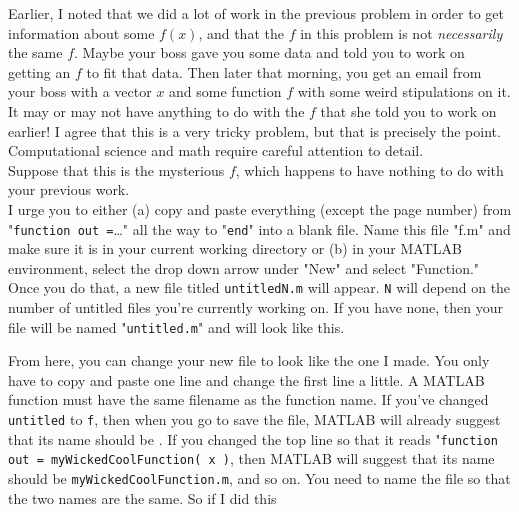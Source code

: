 \documentclass{article}
\begin{document}
Earlier, I noted that we did a lot of work in the previous problem in order to get information about some $f(x)$, and that the $f$ in this problem is not \textit{necessarily} the same $f$. Maybe your boss gave you some data and told you to work on getting an $f$ to fit that data. Then later that morning, you get an email from your boss with a vector $x$ and some function $f$ with some weird stipulations on it. It may or may not have anything to do with the $f$ that she told you to work on earlier! I agree that this is a very tricky problem, but that is precisely the point. Computational science and math require careful attention to detail.\\

Suppose that this is the mysterious $f$, which happens to have nothing to do with your previous work.\\



I urge you to either (a) copy and paste everything (except the page number) from "\texttt{function out =}\dots" all the way to "\texttt{end}" into a blank file. Name this file "f.m" and make sure it is in your current working directory or (b) in your MATLAB environment, select the drop down arrow under "New" and select "Function." Once you do that, a new file titled \texttt{untitledN.m} will appear. \texttt{N} will depend on the number of untitled files you're currently working on. If you have none, then your file will be named "\texttt{untitled.m}" and will look like this.



{\setlength{\parindent}{0cm}
From here, you can change your new file to look like the one I made. You only have to copy and paste one line and change the first line a little. A MATLAB function must have the same filename as the function name. If you've changed \texttt{untitled} to \texttt{f}, then when you go to save the file, MATLAB will already suggest that its name should be . If you changed the top line so that it reads "\texttt{function out = myWickedCoolFunction( x )}, then MATLAB will suggest that its name should be \texttt{myWickedCoolFunction.m}, and so on. You need to name the file so that the two names are the same. So if I did this}


\end{document}
